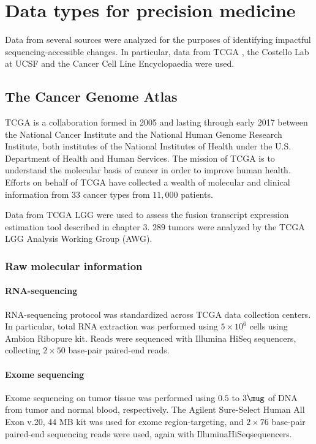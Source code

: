 \chapter{Data types for precision medicine}

Data from several sources were analyzed for the purposes of
identifying impactful sequencing-accessible changes. In particular,
data from TCGA \cite{_comprehensive_2015}, the Costello Lab at
UCSF\cite{johnson_mutational_2014} and the Cancer Cell Line
Encyclopaedia\cite{barretina_cancer_2012} were used.

\section{The Cancer Genome Atlas}

TCGA is a collaboration formed in 2005 and lasting through early 2017
between the National Cancer Institute and the National Human Genome
Research Institute, both institutes of the National Institutes of
Health under the U.S. Department of Health and Human Services\cite{_program_2016}.  The
mission of TCGA is to understand the molecular basis of cancer in
order to improve human health\cite{_nih_2005}. Efforts on behalf of TCGA have
collected a wealth of molecular and clinical information from $33$
cancer types from $11,000$ patients.

Data from TCGA LGG were used to assess the fusion transcript
expression estimation tool described in chapter 3. $289$ tumors were
analyzed by the TCGA LGG Analysis Working Group (AWG).

\subsection{Raw molecular information}

\subsubsection{RNA-sequencing}
RNA-sequencing protocol was standardized across TCGA data collection
centers. In particular, total RNA extraction was performed using
$5 \times 10^6$ cells using Ambion\textsuperscript{\textregistered}
Ribopure\textsuperscript{\texttrademark} kit. Reads were sequenced
with Illumina\textsuperscript{\textregistered}
HiSeq\textsuperscript{\texttrademark} sequencers, collecting
$2 \times 50$ base-pair paired-end reads.

\subsubsection{Exome sequencing}
Exome sequencing on tumor tissue was performed using $0.5$ to $3 \mug$
of DNA from tumor and normal blood, respectively. The Agilent\reg
Sure-Select Human All Exon \tm v.20, 44 MB kit was used for exome
region-targeting, and $2 \times 76$ base-pair paired-end sequencing
reads were used, again with Illumina\reg HiSeq\tm sequencers.


